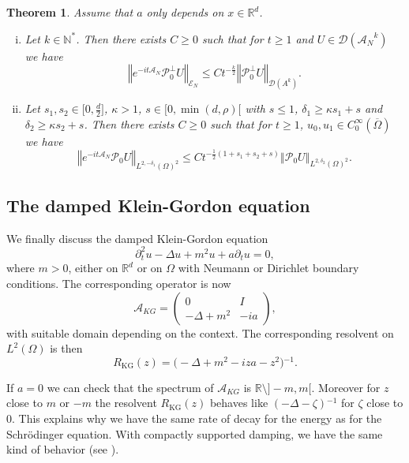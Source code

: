 \documentclass[10pt, a4paper,reqno]{amsart}
\theoremstyle{plain}
\newtheorem{theorem}{{Theorem}}[section]
\theoremstyle{definition}
\theoremstyle{remark}
\begin{document}
\begin{theorem} \label{th-energy-decay-bis} 
Assume that $a$ only depends on $x \in {\mathbb{R}}^d$.
\begin{enumerate} [(i)]
\item \label{th-item-bot}
Let $k \in {\mathbb{N}}^*$. Then there exists $C {\geqslant} 0$ such that for $t {\geqslant} 1$ and $U \in {{\mathcal D}}({{{\mathcal A}}_N}^k)$ we have 
\[
{\left\Vert {e^{-it{{{\mathcal A}}_N}} {{\mathcal P}}_0^\bot U}\right\Vert}_{\mathscr E_N} {\leqslant} C t^{-\frac k 2} {\left\Vert {{{\mathcal P}}_0^\bot U}\right\Vert}_{{{\mathcal D}}(A^k)}.
\]
\item 
Let $s_1,s_2 \in \big[0,\frac d 2]$, ${\kappa} > 1$, $s \in [0,\min(d,\rho)[$ with $s {\leqslant} 1$, ${\delta}_1 {\geqslant}  {\kappa} s_1 + s$ and ${\delta}_2 {\geqslant}  {\kappa} s_2 + s$. Then there exists $C {\geqslant} 0$ such that for $t {\geqslant} 1$, $u_0,u_1 \in C_0^\infty({\overline{\Omega}})$ we have 
\[
{\left\Vert {e^{-it{{{\mathcal A}}_N}} {{\mathcal P}}_0 U}\right\Vert}_{L^{2,-{\delta}_1}({\Omega})^2} {\leqslant} C t^{-\frac 12 (1 + s_1 + s_2 + s)} {\left\Vert {{{\mathcal P}}_0 U}\right\Vert}_{L^{2,{\delta}_2}({\Omega})^2}.
\]
\end{enumerate}
\end{theorem}

\subsection{The damped Klein-Gordon equation}

We finally discuss the damped Klein-Gordon equation 
\[
\partial_t^2 u - {\Delta} u + m^2 u + a \partial_t u = 0,
\]
where $m > 0$, either on ${\mathbb{R}}^d$ or on ${\Omega}$ with Neumann or Dirichlet boundary conditions. The corresponding operator is now 
\[
{{{\mathcal A}}_{KG}} = \begin{pmatrix} 0 & I \\ -{\Delta} + m^2 & -i a \end{pmatrix},
\]
with suitable domain depending on the context. The corresponding resolvent on $L^2({\Omega})$ is then 
\[
R_{\mathrm{KG}}(z) = \big( - {\Delta} + m^2 - i z a - z^2 \big){^{-1}}.
\]

If $a = 0$ we can check that the spectrum of ${{{\mathcal A}}_{KG}}$ is ${\mathbb{R}} \setminus ]-m,m[$. Moreover for $z$ close to $m$ or $-m$ the resolvent $R_{\mathrm{KG}}(z)$ behaves like $(-{\Delta} -{\zeta}){^{-1}}$ for ${\zeta}$ close to 0. This explains why we have the same rate of decay for the energy as for the Schr\"odinger equation. With compactly supported damping, we have the same kind of behavior (see \cite{Malloug16}).
\end{document}
